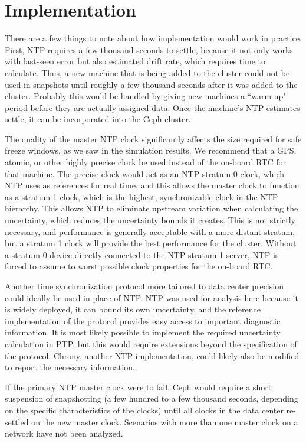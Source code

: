 \chapter{Implementation}
\label{sec:impl}

There are a few things to note about how implementation would work in
practice. First, NTP requires a few thousand seconds to settle,
because it not only works with last-seen error but also estimated
drift rate, which requires time to calculate. 
Thus, a new machine that is
being added to the cluster could not be used in snapshots until
roughly a few thousand seconds after it was added to the
cluster. Probably this would be handled by giving new machines a ``warm
up" period before they are actually assigned data. Once the machine's
NTP estimates settle, it can be incorporated into the Ceph cluster.

The quality of the master NTP clock significantly affects the size
required for safe freeze windows, as we saw in the simulation
results. We recommend that a GPS, atomic, or other highly precise
clock be used
instead of the on-board RTC for that machine. The precise clock would act as an NTP stratum 0 clock, which NTP uses as references for real time, and this allows the master
clock to function as a stratum 1 clock, which is the highest, synchronizable clock in the NTP hierarchy. This allows NTP to eliminate upstream variation when calculating the uncertainty, which reduces the uncertainty bounds it creates. This is not strictly necessary, and
performance is generally acceptable with a more distant stratum, but a
stratum 1 clock will provide the best performance for the
cluster. Without a stratum 0 device directly connected to the NTP
stratum 1 server, NTP is forced to assume to worst possible clock
properties for the on-board RTC.

Another time synchronization protocol more tailored to data center precision could ideally be used in place of NTP. NTP
was used for analysis here because it is widely deployed, it can bound
its own uncertainty, and the reference implementation of the protocol
provides easy access to important diagnostic information. It is most
likely possible to implement the required uncertainty calculation in
PTP, but this would require extensions beyond the specification of the
protocol. Chrony, another NTP implementation, could likely also be
modified to report the necessary information.

If the primary NTP master clock were to fail, Ceph would require a
short suspension of snapshotting (a few hundred to a few thousand
seconds, depending on the specific characteristics of the clocks)
until all clocks in the data center re-settled on the new master
clock. Scenarios with more than one master clock on a network have not
been analyzed.

